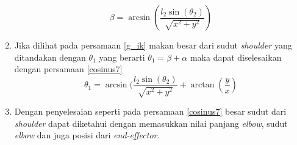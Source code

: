 \begin{enumerate}
\begin{equation}
	\beta=\arcsin(\frac{l_{2}\sin(\theta_{2})}{\sqrt{x^2+y^2}})
	\label{cosinus6}
	\end{equation}
	\item Jika dilihat pada persamaan \ref{g_ik} makan besar dari sudut \textit{shoulder} yang ditandakan dengan $\theta_{1}$ yang berarti $\theta_{1}=\beta+\alpha$ maka dapat diselesaikan dengan persamaan \ref{cosinus7}
	\begin{equation}
	\theta_{1}=\arcsin(\frac{l_{2}\sin(\theta_{2})}{\sqrt{x^2+y^2}}+\arctan(\frac{y}{x})
	\label{cosinus7}
	\end{equation}
	\item  Dengan penyelesaian seperti pada persamaan \ref{cosinus7} besar sudut dari \textit{shoulder} dapat diketahui dengan memasukkan nilai panjang \textit{elbow}, sudut \textit{elbow} dan juga posisi dari \textit{end-effector}.
\end{enumerate}


